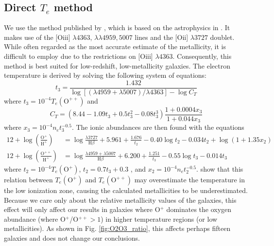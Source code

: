 \subsection{Direct $T_e$ method}
We use the method published by \cite{Izotov06}, which is based on the 
astrophysics in \cite{Osterbrock89}.  It makes use of the [O{\sc iii}] 
$\lambda 4363$, $\lambda \lambda 4959, 5007$ lines and the [O{\sc ii}] 
$\lambda 3727$ doublet.  While often regarded as the most accurate estimate of 
the metallicity, it is difficult to employ due to the restrictions on 
[O{\sc iii}] $\lambda 4363$.  Consequently, this method is best suited for 
low-redshift, low-metallicity galaxies.  The electron temperature is derived by 
solving the following system of equations:
\begin{equation}
	t_3 = \frac{1.432}{\log[(\lambda 4959 + \lambda 5007)/\lambda 4363] - \log C_T}
\end{equation}
where $t_3 = 10^{-4} T_e(\text{O}^{++})$ and
\begin{equation}
	C_T = (8.44 - 1.09t_3 + 0.5t_3^2 - 0.08t_3^3)\frac{1 + 0.0004x_3}{1 + 0.044x_3}
\end{equation}
where $x_3 = 10^{-4} n_e t_3^{-0.5}$.  The ionic abundances are then found with 
the equations
\begin{align}
	12 + \log \left( \frac{\text{O}^+}{\text{H}^+} \right) &= \log \frac{\lambda 3727}{\text{H}\beta} + 5.961 + \frac{1.676}{t_2} - 0.40\log t_2 - 0.034t_2 + \log (1+1.35x_2) \\
	12 + \log \left( \frac{\text{O}^{++}}{\text{H}^+} \right) &= \log \frac{\lambda 4959 + \lambda 5007}{\text{H}\beta} + 6.200 + \frac{1.251}{t_3} - 0.55\log t_3 - 0.014t_3
\end{align}
where $t_2 = 10^{-4} T_e(\text{O}^+)$, $t_2 = 0.7t_3 + 0.3$ \citep{Garnett92}, 
and $x_2 = 10^{-4} n_e t_2^{-0.5}$.  \cite{Andrews13} show that this relation 
between $T_e(\text{O}^+)$ and $T_e(\text{O}^{++})$ may overestimate the 
temperature in the low ionization zone, causing the calculated metallicities to 
be underestimated.  Because we care only about the relative metallicity values 
of the galaxies, this effect will only affect our results in galaxies where 
O$^+$ dominates the oxygen abundance (where O$^+$/O$^{++} > 1$) in higher 
temperature regions (or low metallicities).  As shown in Fig. 
\ref{fig:O2O3_ratio}, this affects perhaps fifteen galaxies and does not change 
our conclusions.

